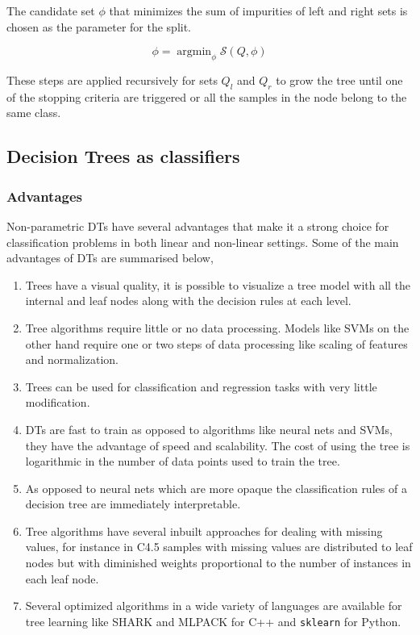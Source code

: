 \documentclass[final,3p,times,twocolumn]{elsarticle}
\DeclareMathOperator{\argmin}{argmin}
\begin{document}
The candidate set $\phi$ that minimizes the sum of impurities of left and right sets is chosen as the parameter for the split.

\begin{equation}
\phi = \argmin_{\phi}\mathcal{S}(Q,\phi)
\end{equation}

These steps are applied recursively for sets $Q_{l}$ and $Q_{r}$ to grow the tree until one of the stopping criteria are triggered or all the samples in the node belong to the same class. 
\cite{MDT}

\subsection{Decision Trees as classifiers}

\subsubsection{Advantages}
Non-parametric DTs have several advantages that make it a strong choice for classification problems in both linear and non-linear settings. Some of the main advantages of DTs are summarised below, 

\begin{enumerate}
\item{Trees have a visual quality, it is possible to visualize a tree model with all the internal and leaf nodes along with the decision rules at each level.}
\item{Tree algorithms require little or no data processing. Models like SVMs on the other hand require one or two steps of data processing like scaling of features and normalization.}
\item{Trees can be used for classification and regression tasks with very little modification.}
\item{DTs are fast to train as opposed to algorithms like neural nets and SVMs, they have the advantage of speed and scalability. The cost of using the tree is logarithmic in the number of data points used to train the tree.}
\item{As opposed to neural nets which are more opaque the classification rules of a decision tree are immediately interpretable.}
\item{Tree algorithms have several inbuilt approaches for dealing with missing values, for instance in C4.5 samples with missing values are distributed to leaf nodes but with diminished weights proportional to the number of instances in each leaf node.}
\item{Several optimized algorithms in a wide variety of languages are available for tree learning like SHARK \cite{SHARK} and MLPACK \cite{MLPACK} for C++ and \texttt{sklearn} \cite{SKLEARN} for Python.}
\end{enumerate}
\end{document}
